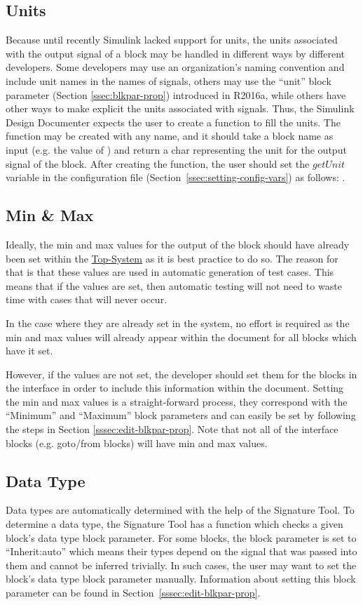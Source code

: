 \documentclass{mcscert}
\newcommand{\sigtool}{Signature Tool}
\newcommand{\sddtool}{Simulink Design Documenter}
\newcommand{\topsystemnolink}{Top-System} %
\newcommand{\topsystem}{\hyperref[def:topsystem]{\topsystemnolink{}}}
\begin{document}
	\subsection{Units}
	\label{ssec:include-int-units}
	Because until recently Simulink lacked support for units, the units associated with the output signal of a block may be handled in different ways by different developers. 
	Some developers may use an organization's naming convention and include unit names in the names of signals, others may use the ``unit'' block parameter (Section \ref{ssec:blkpar-prop}) introduced in R2016a, while others have other ways to make explicit the units associated with signals. 
	Thus, the \sddtool{} expects the user to create a \matlab{} function to fill the units. 
	The function may be created with any name, and it should take a block name as input (e.g. the value of ) and return a char representing the unit for the output signal of the block. 
	After creating the function, the user should set the $getUnit$ variable in the configuration file (Section~\ref{ssec:setting-config-vars}) as follows: . 
	  
	\subsection{Min \& Max}
	\label{ssec:include-int-minmax}
	Ideally, the min and max values for the output of the block should have already been set within the \topsystem{} as it is best practice to do so. 
	The reason for that is that these values are used in automatic generation of test cases. 
	This means that if the values are set, then automatic testing will not need to waste time with cases that will never occur.
	  
	In the case where they are already set in the system, no effort is required as the min and max values will already appear within the document for all blocks which have it set.
	  
	However, if the values are not set, the developer should set them for the blocks in the interface in order to include this information within the document. 
	Setting the min and max values is a straight-forward process, they correspond with the ``Minimum'' and ``Maximum'' block parameters and can easily be set by following the steps in Section \ref{sssec:edit-blkpar-prop}. 
	Note that not all of the interface blocks (e.g. goto/from blocks) will have min and max values.
	  
	\subsection{Data Type}
	\label{ssec:include-int-data-type}
	Data types are automatically determined with the help of the \sigtool{}. 
	To determine a data type, the \sigtool{} has a function which checks a given block's data type block parameter. 
	For some blocks, the block parameter is set to ``Inherit:auto'' which means their types depend on the signal that was passed into them and cannot be inferred trivially. 
	In such cases, the user may want to set the block's data type block parameter manually. 
	Information about setting this block parameter can be found in Section~\ref{sssec:edit-blkpar-prop}.
\end{document}
